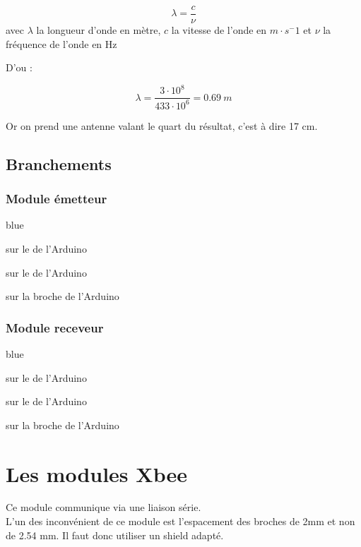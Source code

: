 $$ \lambda = \frac{c}{\nu}$$
 avec $\lambda$ la longueur d'onde en mètre, $c$ la vitesse de l'onde en $m\cdot s^-1 $ et  $\nu $ la fréquence de l'onde en Hz

 D'ou : 

 $$ \lambda = \frac{3\cdot 10^{8}}{433\cdot 10^{6}} = 0.69 ~m $$

 Or on prend une antenne valant le quart du résultat, c'est à dire 17 cm.

 \subsection{Branchements}

 \subsubsection{Module émetteur}
 \begin{items}{blue}{\Bullet}
    \item {} sur le  de l'Arduino
    \item {} sur le  de l'Arduino
    \item {} sur la broche  de l'Arduino
 \end{items}

 \subsubsection{Module receveur}

 \begin{items}{blue}{\Bullet}
    \item {} sur le  de l'Arduino
    \item {} sur le  de l'Arduino
    \item {} sur la broche  de l'Arduino
 \end{items}


 \section{Les modules Xbee }


 Ce module communique via une liaison série.\\ L'un des inconvénient de ce module est l'espacement des broches de 2mm et non de 2.54 mm.
 Il faut donc utiliser un shield adapté.

